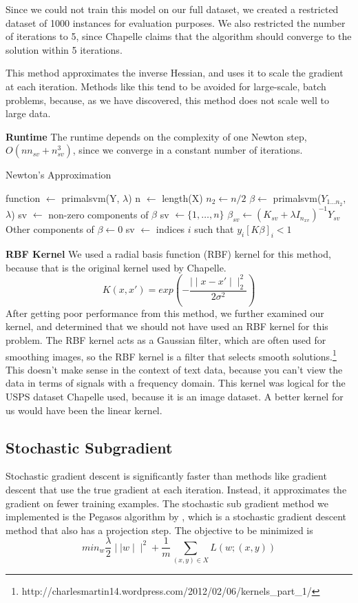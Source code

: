 \documentclass[letterpaper, 11pt]{article}
\begin{document}
Since we could not train this model on our full dataset, we created a restricted dataset of 1000 instances for evaluation purposes.  We also restricted the number of iterations to 5, since Chapelle claims that the algorithm should converge to the solution within 5 iterations.

This method approximates the inverse Hessian, and uses it to scale the gradient at each iteration.  Methods like this tend to be avoided for large-scale, batch problems, because, as we have discovered, this method does not scale well to large data.

\textbf{Runtime}  The runtime depends on the complexity of one Newton step, $O(nn_{sv} + n^3_{sv})$, since we converge in a constant number of iterations.  

\begin{algorithm}
\caption{Newton's Approximation}
\begin{algorithmic}
\STATE function $\leftarrow$ primalsvm(Y, $\lambda$)
\STATE n $\leftarrow$ length(X)
\STATE $n_2 \leftarrow n/2$
\STATE $\beta \leftarrow$ primalsvm($Y_{1\ldots n_2}$, $\lambda$)
\STATE sv $\leftarrow$ non-zero components of $\beta$
\ELSE
\STATE sv $\leftarrow \{ 1, \ldots, n \}$
\ENDIF
\REPEAT
\STATE $\beta_{sv} \leftarrow (K_{sv} + \lambda I_{n_{xv}})^{-1}Y_{sv}$
\STATE Other components of $\beta \leftarrow 0$
\STATE sv $\leftarrow$ indices $i$ such that $y_i[K\beta]_i < 1$
\end{algorithmic}
\end{algorithm}
\textbf{RBF Kernel}  We used a radial basis function (RBF) kernel for this method, because that is the original kernel used by Chapelle.  $$ K(x, x') = exp(-\frac{\mid \mid x-x' \mid \mid^2_2 }{2\sigma^2}) $$After getting poor performance from this method, we further examined our kernel, and determined that we should not have used an RBF kernel for this problem. The RBF kernel acts as a Gaussian filter, which are often used for smoothing images, so the RBF kernel is a filter that selects smooth solutions.\footnote{http://charlesmartin14.wordpress.com/2012/02/06/kernels\_part\_1/ }  This doesn't make sense in the context of text data, because you can't view the data in terms of signals with a frequency domain.  This kernel was logical for the USPS dataset Chapelle used, because it is an image dataset.  A better kernel for us would have been the linear kernel.

\subsection{Stochastic Subgradient}
Stochastic gradient descent is significantly faster than methods like gradient descent that use the true gradient at each iteration.  Instead, it approximates the gradient on fewer training examples.  The stochastic sub gradient method we implemented is the Pegasos algorithm by \citeauthor{pegasos}, which is a stochastic gradient descent method that also has a projection step.  The objective to be minimized is \begin{equation} min_w \frac{\lambda}{2} \mid \mid w \mid \mid ^2 +\frac{1}{m} \sum_{(x, y) \in X} L(w; (x,y)) \end{equation}
\end{document}
